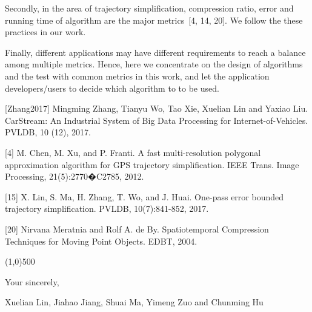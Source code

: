 \documentclass{letter}
\newcommand{\eg}{\emph{e.g.,}\xspace}
\begin{document}
Secondly, in the area of trajectory simplification, compression ratio, error and running time of algorithm are the major metrics~[4, 14, 20]. We follow the these practices in our work.


Finally, different applications may have different requirements to reach a balance among multiple metrics. Hence, here we concentrate on the design of algorithms and the test with common metrics in this work, and let the application developers/users to decide which algorithm to to be used.

[Zhang2017] Mingming Zhang, Tianyu Wo, Tao Xie, Xuelian Lin and Yaxiao Liu. CarStream: An Industrial System of Big Data Processing for Internet-of-Vehicles. PVLDB, 10 (12), 2017.

[4] M. Chen, M. Xu, and P. Franti. A fast multi-resolution polygonal approximation algorithm for GPS trajectory
simplification. IEEE Trans. Image Processing, 21(5):2770�C2785, 2012.

[15] X. Lin, S. Ma, H. Zhang, T. Wo, and J. Huai. One-pass error bounded trajectory simplification. PVLDB, 10(7):841-852, 2017.

[20] Nirvana Meratnia and Rolf A. de By. Spatiotemporal Compression Techniques for Moving Point Objects. EDBT, 2004.


\line(1,0){500}



Your sincerely,

Xuelian Lin, Jiahao Jiang, Shuai Ma, Yimeng Zuo and Chunming Hu



%
%
\end{document}
